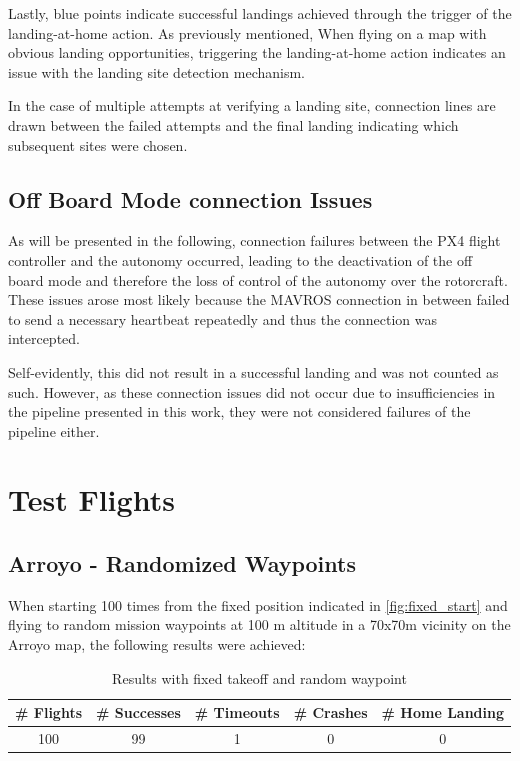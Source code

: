 Lastly, blue points indicate successful landings achieved through the trigger of the landing-at-home action. As previously mentioned, When flying on a map with obvious landing opportunities, triggering the landing-at-home action indicates an issue with the landing site detection mechanism.

In the case of multiple attempts at verifying a landing site, connection lines are drawn between the failed attempts and the final landing indicating which subsequent sites were chosen.


\subsection{Off Board Mode connection Issues}
As will be presented in the following, connection failures between the PX4 flight controller and the autonomy occurred, leading to the deactivation of the off board mode and therefore the loss of control of the autonomy over the rotorcraft. These issues arose most likely because the MAVROS connection in between failed to send a necessary heartbeat repeatedly and thus the connection was intercepted.

Self-evidently, this did not result in a successful landing and was not counted as such. However, as these connection issues did not occur due to insufficiencies in the pipeline presented in this work, they were not considered failures of the pipeline either.
\clearpage
\section{Test Flights}\label{sec:test_flights}
\subsection{Arroyo - Randomized Waypoints}\label{subsec:eval_rand_wp}

When starting 100 times from the fixed position indicated in \cref{fig:fixed_start} and flying to random mission waypoints at 100 m altitude in a 70x70m vicinity on the Arroyo map, the following results were achieved:

\begin{table}[h]
    \begin{center}
     \caption{Results with fixed takeoff and random waypoint}\vspace{1ex}
     \label{tab:result_random_waypoint}
     \begin{tabular}{|c|c|c|c|c|}
     \hline
     \# Flights & \# Successes & \# Timeouts & \# Crashes & \# Home Landing\\ \hline \hline
     100 & 99 & 1 & 0 & 0 \\
     \hline
     \end{tabular}
    \end{center}
    \end{table}

